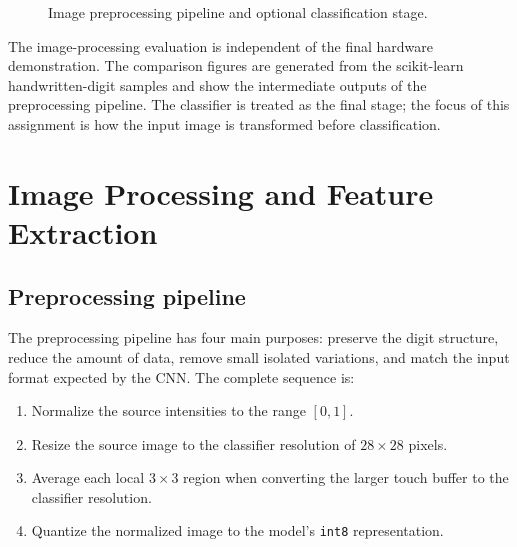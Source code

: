 \documentclass[conference]{IEEEtran}
\begin{document}
\begin{figure}[ht]
\centering
{}
\caption{Image preprocessing pipeline and optional classification stage.}
\label{fig:pipeline}
\end{figure}

The image-processing evaluation is independent of the final hardware demonstration. The comparison figures are generated from the scikit-learn handwritten-digit samples and show the intermediate outputs of the preprocessing pipeline. The classifier is treated as the final stage; the focus of this assignment is how the input image is transformed before classification.

\section{Image Processing and Feature Extraction}
\subsection{Preprocessing pipeline}
The preprocessing pipeline has four main purposes: preserve the digit structure, reduce the amount of data, remove small isolated variations, and match the input format expected by the CNN. The complete sequence is:

\begin{enumerate}
\item Normalize the source intensities to the range $[0,1]$.
\item Resize the source image to the classifier resolution of $28 \times 28$ pixels.
\item Average each local $3 \times 3$ region when converting the larger touch buffer to the classifier resolution.
\item Quantize the normalized image to the model's \texttt{int8} representation.
\end{enumerate}
\end{document}
